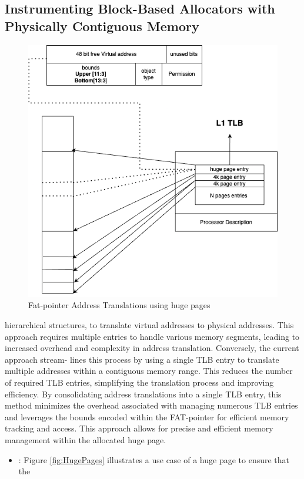 \documentclass[11pt]{article}
\begin{document}
\subsection{Instrumenting Block-Based Allocators with Physically Contiguous Memory}
\label{sec:orgc5f7075}
\begin{figure}[htbp]
\centering
\includegraphics[width=.9\linewidth]{diagram/hugepages.drawio.png}
\caption{\label{fig:org0063361}Fat-pointer Address Translations using huge pages}
\end{figure}

hierarchical structures, to translate virtual addresses to physical addresses. This approach requires multiple entries to handle various
memory segments, leading to increased overhead and complexity
in address translation. Conversely, the current approach stream-
lines this process by using a single TLB entry to translate multiple
addresses within a contiguous memory range. This reduces the
number of required TLB entries, simplifying the translation process
and improving efficiency. By consolidating address translations into
a single TLB entry, this method minimizes the overhead associated
with managing numerous TLB entries and leverages the bounds
encoded within the FAT-pointer for efficient memory tracking and
access. This approach allows for precise and efficient memory management within the allocated huge page.

\begin{itemize}
\item\relax [ ]: Figure \ref{fig:HugePages} illustrates a use case of a huge page to ensure that the
\end{itemize}
\end{document}
